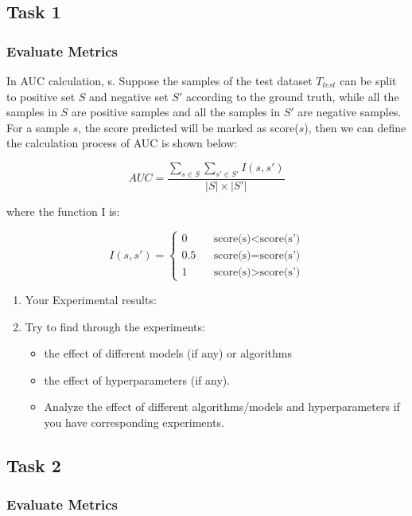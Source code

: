 \documentclass[lettersize,journal]{IEEEtran}
\begin{document}
\subsection{Task 1}

\subsubsection{Evaluate Metrics}

In AUC calculation, s. Suppose the samples of the test dataset $T_{test}$ can be split to  positive set $S$ and negative set $S'$ according to the ground truth, while all the samples in $S$ are positive samples and all the samples in $S'$ are negative samples. For a sample $s$, the score predicted will be marked as score($s$), then we can define the calculation process of AUC is shown below:

$$
AUC=\frac{\sum_{s \in S} \sum_{s' \in S'}I(s, s')}{|S| \times |S'|}
$$

where the function I is:

$$
I(s, s')=
\left\{
    \begin{aligned}
        0 && \text{score(s)$<$score(s')}\\
        0.5 && \text{score(s)$=$score(s')} \\
        1 && \text{score(s)$>$score(s')}
    \end{aligned}
\right.
$$

\begin{enumerate}
    \item Your Experimental results:
    \item Try to find through the experiments:
    \begin{itemize}
        \item the effect of different models (if any) or algorithms
        \item the effect of hyperparameters (if any).
        \item Analyze the effect of different algorithms/models and hyperparameters if you have corresponding experiments.
    \end{itemize}
\end{enumerate}

\subsection{Task 2}

\subsubsection{Evaluate Metrics}
\end{document}
